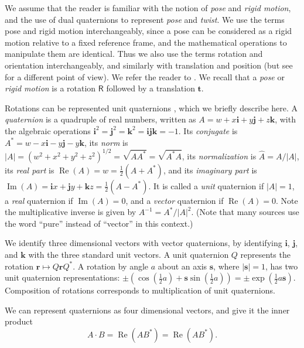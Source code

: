 \documentclass[reqno,12pt]{amsart}
\newcommand\bi{\bm i}
\newcommand\bj{\bm j}
\newcommand\bk{\bm k}
\DeclareMathOperator\realpart{Re}
\DeclareMathOperator\imagpart{Im}
\begin{document}
We assume that the reader is familiar with the notion of \emph{pose} and \emph{rigid motion}, and the use of dual quaternions to represent \emph{pose} and \emph{twist}.  We use the terms pose and rigid motion interchangeably, since a pose can be considered as a rigid motion relative to a fixed reference frame, and the mathematical operations to manipulate them are identical.  Thus we also use the terms rotation and orientation interchangeably, and similarly with translation and position (but see \cite{chirikjian-et-al} for a different point of view).  We refer the reader to \cite{adorno,agrawal,bottema-et-al,clifford,gallardo-alvarado,han-et-al,kavan-et-al,kavan-et-al-2,kenwright,kussaba-et-al,montgomery-smith-et-al,schilling1,schilling2,selig-book,silva-et-al,spong-et-al,wang-et-al}.  We recall that a \emph{pose} or \emph{rigid motion} is a rotation $\mathsf R$ followed by a translation $\bm t$.

Rotations can be represented unit quaternions \cite{quaternions1,quaternions2}, which we briefly describe here.  A \emph{quaternion} is a quadruple of real numbers, written as $A = w + x \bi + y \bj + z \bk$, with the algebraic operations $\bi^2 = \bj^2 = \bk^2 = \bi \bj \bk = -1$.  Its \emph{conjugate} is $A^* = w - x \bi - y \bj - y \bk$, its \emph{norm} is $|A| = (w^2+x^2+y^2+z^2)^{1/2} = \sqrt{A A^*} = \sqrt{A^* A}$, its \emph{normalization} is $\widehat A = A/|A|$, its \emph{real part} is $\realpart(A) = w = \tfrac12(A + A^*)$, and its \emph{imaginary part} is $\imagpart(A) = \bi x + \bj y + \bk z = \tfrac12(A - A^*)$.  It is called a \emph{unit} quaternion if $|A| = 1$, a \emph{real} quaternion if $\imagpart(A) = 0$, and a \emph{vector} quaternion if $\realpart(A) = 0$.  Note the multiplicative inverse is given by $A^{-1} = A^*/|A|^2$.  (Note that many sources use the word ``pure'' instead of ``vector'' in this context.)

We identify three dimensional vectors with vector quaternions, by identifying $\bi$, $\bj$, and $\bk$ with the three standard unit vectors.  A unit quaternion $Q$ represents the rotation $\bm r \mapsto Q \bm r Q^*$.  A rotation by angle $a$ about an axis $\bm s$, where $|\bm s| = 1$, has two unit quaternion representations: $\pm(\cos(\tfrac12 a) + \bm s \sin(\tfrac12 a)) = \pm \exp(\tfrac12 a \bm s)$.  Composition of rotations corresponds to multiplication of unit quaternions.

We can represent quaternions as four dimensional vectors, and give it the inner product
\begin{equation}
A \cdot B = \realpart(A B^*) = \realpart(A B^*) .
\end{equation}
\end{document}

